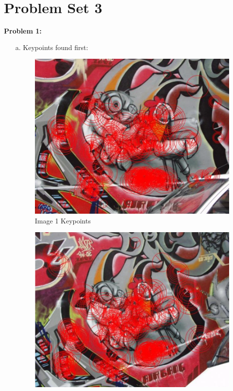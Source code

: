 \documentclass[a4paper, 12pt]{report}
\begin{document}
\section*{{\textbf{Problem Set 3}}}
\textbf{Problem 1:}
\begin{itemize}
\item[a.] Keypoints found first:
\begin{figure}[h]
\includegraphics[scale=.53]{1.png}
\centering
\caption{Image 1 Keypoints}
\end{figure}
\begin{figure}[h]
\includegraphics[scale=.53]{2.png}
\centering

\end{figure}
\end{itemize}
\end{document}

